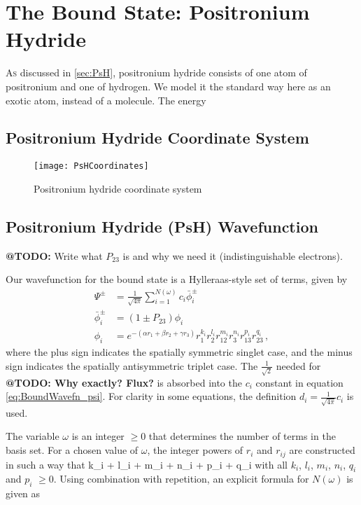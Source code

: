 \documentclass[Dissertation.tex]{subfiles}
\begin{document}
\chapter{The Bound State: Positronium Hydride}
\label{chp:PsHBound}

\lettrine{A}{s} discussed in \cref{sec:PsH}, positronium hydride consists of one atom of positronium and one of hydrogen. We model it the standard way here as an exotic atom, instead of a molecule. The energy 

\section{Positronium Hydride Coordinate System}
\begin{figure}[!h]
	\centering
	\texttt{[image: PsHCoordinates]}
	\caption{Positronium hydride coordinate system}
	\label{fig:PsHCoords}
\end{figure}

\section{Positronium Hydride (PsH) Wavefunction}
\label{sec:BoundWavefn}

\textbf{@TODO:} Write what $P_{23}$ is and why we need it (indistinguishable electrons).

Our wavefunction for the bound state is a Hylleraas-style set of terms, given by
\begin{subequations}
\label{eq:BoundWavefn}
\begin{align}
\Psi^\pm &= \frac{1}{\sqrt{4\pi}} \sum_{i=1}^{N(\omega)} c_i \bar{\phi}_i^\pm \label{eq:BoundWavefn_psi} \\
\bar{\phi}_i^\pm &= (1 \pm P_{23}) \phi_i \label{eq:BoundWavefn_phibar} \\
\phi_i &= e^{-(\alpha r_1 + \beta r_2 + \gamma r_3)} r_1^{k_i} r_2^{l_i} r_{12}^{m_i} r_3^{n_i} r_{13}^{p_i} r_{23}^{q_i} \label{eq:BoundWavefn_phi} \, ,
\end{align}
\end{subequations}
\noindent where the plus sign indicates the spatially symmetric singlet case, and the minus sign indicates the spatially antisymmetric triplet case.  The $\frac{1}{\sqrt{2}}$ needed for \textbf{@TODO: Why exactly? Flux?} is absorbed into the $c_i$ constant in equation \ref{eq:BoundWavefn_psi}.  For clarity in some equations, the definition $d_i = \frac{1}{\sqrt{4\pi}} c_i$ is used.

The variable $\omega$ is an integer $\geq 0$ that determines the number of terms in the basis set.  For a chosen value of $\omega$, the integer powers of $r_i$ and $r_{ij}$ are constructed in such a way that
\beq
\label{eq:OmegaDef}
k_i + l_i + m_i + n_i + p_i + q_i \leq \omega
\eeq
\noindent with all $k_i$, $l_i$, $m_i$, $n_i$, $q_i$ and $p_i$ $\geq 0$.  Using combination with repetition, an explicit formula for $N(\omega)$ is given as
\end{document}
